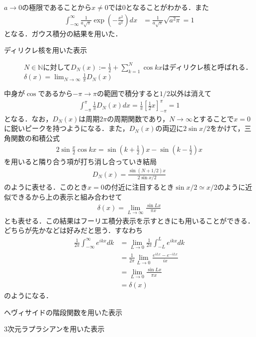 \documentclass{jsarticle}
\def\kakko#1{\left( #1 \right) }
\def\kkakko#1{\left[ #1 \right] }
\begin{document}
$a\to0$の極限であることから$x\neq0$では0となることがわかる．また\begin{align}
\int_{-\infty}^{\infty} \frac{1}{a\sqrt{\pi}}\exp{\kakko{-\frac{x^2}{a^2}}}dx&=\frac{1}{a\sqrt{\pi}}\sqrt{a^{2}\pi}=1
\end{align}
となる．ガウス積分の結果を用いた．
\begin{description}
\item[ディリクレ核を用いた表示] $N\in\mathbb{N}$に対して$\displaystyle D_{N}(x):=\frac{1}{2}+\sum_{k=1}^{N}\cos{kx}$はディリクレ核と呼ばれる．\\$\displaystyle \delta(x)=\lim_{N\to \infty}\frac{1}{\pi}D_{N}(x)$
\end{description}

中身が$\cos$であるから$-\pi\to\pi$の範囲で積分すると$1/2$以外は消えて
\begin{align}
\int_{-\pi}^{\pi}\frac{1}{\pi}D_{N}(x)dx=\frac{1}{\pi}\kkakko{\frac{1}{2}x}_{-\pi}^{\pi}=1
\end{align}
となる．なお，$D_{N}(x)$は周期$2\pi$の周期関数であり，$N\to\infty$とすることで$x=0$に鋭いピークを持つようになる．また，$D_{N}(x)$の両辺に$2\sin{x/2}$をかけて，三角関数の和積公式
\begin{align}
2\sin{\frac{x}{2}}\cos{kx}=\sin{\kakko{k+\frac{1}{2}}x}-\sin{\kakko{k-\frac{1}{2}}x}
\end{align}
を用いると隣り合う項が打ち消し合っていき結局
\begin{align}
D_{N}(x)=\frac{\sin{\kakko{N+1/2}x}}{2\sin{x/2}}
\end{align}
のように表せる．このとき$x=0$の付近に注目するとき$\sin{x/2}\simeq x/2$のように近似できるから上の表示と組み合わせて
\begin{align}
\delta(x)=\lim_{L\to\infty}\frac{\sin{Lx}}{\pi x}
\end{align}
とも表せる．この結果はフーリエ積分表示を示すときにも用いることができる．どちらが先かなどは好みだと思う．すなわち
\begin{align}
\frac{1}{2\pi}\int_{-\infty}^{\infty}e^{ikx}dk&=\lim_{L\to0}\frac{1}{2\pi}\int_{-L}^{L}e^{ikx}dk\\
&=\frac{1}{2\pi}\lim_{L\to0}\frac{e^{iLx}-e^{-iLx}}{ix}\\
&=\lim_{L\to0}\frac{\sin{Lx}}{\pi x}\\
&=\delta(x)
\end{align}
のようになる．
\begin{description}
\item[ヘヴィサイドの階段関数を用いた表示] 
\end{description}
\begin{description}
\item[3次元ラプラシアンを用いた表示] 
\end{description}
\end{document}

